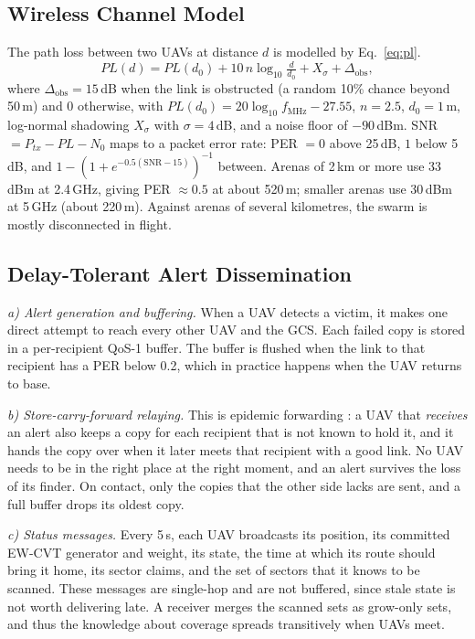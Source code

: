 \documentclass[conference]{IEEEtran}
\begin{document}
\subsection{Wireless Channel Model}
The path loss between two UAVs at distance $d$ is modelled by Eq.~\ref{eq:pl}.
\begin{equation}
PL(d)=PL(d_0)+10\,n\log_{10}\tfrac{d}{d_0}+X_\sigma+\Delta_{\text{obs}},
\label{eq:pl}
\end{equation}
where $\Delta_{\text{obs}}=15$\,dB when the link is obstructed (a random 10\% chance beyond 50\,m) and 0 otherwise,
with $PL(d_0)=20\log_{10}f_{\text{MHz}}-27.55$, $n=2.5$, $d_0=1$\,m, log-normal shadowing $X_\sigma$ with $\sigma=4$\,dB, and a noise floor of $-90$\,dBm. SNR $=P_{tx}-PL-N_0$ maps to a packet error rate: PER $=0$ above 25\,dB, $1$ below 5\,dB, and $1-(1+e^{-0.5(\text{SNR}-15)})^{-1}$ between. Arenas of 2\,km or more use 33\,dBm at 2.4\,GHz, giving PER $\approx0.5$ at about 520\,m; smaller arenas use 30\,dBm at 5\,GHz (about 220\,m). Against arenas of several kilometres, the swarm is mostly disconnected in flight.

\subsection{Delay-Tolerant Alert Dissemination}
\emph{a) Alert generation and buffering.} When a UAV detects a victim, it makes one direct attempt to reach every other UAV and the GCS. Each failed copy is stored in a per-recipient QoS-1 buffer. The buffer is flushed when the link to that recipient has a PER below 0.2, which in practice happens when the UAV returns to base.

\emph{b) Store-carry-forward relaying.} This is epidemic forwarding \cite{vahdat2000epidemic}: a UAV that \emph{receives} an alert also keeps a copy for each recipient that is not known to hold it, and it hands the copy over when it later meets that recipient with a good link. No UAV needs to be in the right place at the right moment, and an alert survives the loss of its finder. On contact, only the copies that the other side lacks are sent, and a full buffer drops its oldest copy.

\emph{c) Status messages.} Every 5\,s, each UAV broadcasts its position, its committed EW-CVT generator and weight, its state, the time at which its route should bring it home, its sector claims, and the set of sectors that it knows to be scanned. These messages are single-hop and are not buffered, since stale state is not worth delivering late. A receiver merges the scanned sets as grow-only sets, and thus the knowledge about coverage spreads transitively when UAVs meet.
\end{document}
